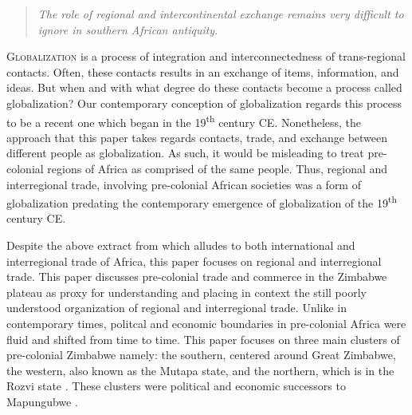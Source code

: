 \begin{filecontents}{\IJSRAidentifier.bib}
	journal = "Journal of African Archaeology",
	year    = "2009",
	volume  = "7",
	number  = "1",
	pages   = "3-39",
}
@article{wood2000,
	author  = "Wood, M.",
	title   = "Making Connections: Relationships between international trade and glass beads from the Shashe-Limpopo area",
	journal = "South African Archaeological Society Goodwin Series",
	year    = "2000",
	volume  = "8",
	pages   = "78-90"
}
@book{sinclair1987,
	author    = "Sinclair, P.J.J.",
	title     = "Space, Time and Social Formation: A Territorial Approach to the Archaeology and Anthropology of Zimbabwe and Mozambique, c. 0–1700 A.D.",
	publisher = "Societas Archaeologica Upsaliensis",
	year      = "1987",
	address   = "Uppsala"
}

\end{filecontents}
\IJSRAopening%

\blockcquote[][6]{pikirayi2017}{\emph{The role of regional and intercontinental exchange remains very difficult to ignore in southern African antiquity}.}

\lettrine{G}{lobalization} is a process of integration and interconnectedness of trans-regional contacts. Often, these contacts results in an exchange of items, information, and ideas. But when and with what degree do these contacts become a process called globalization? Our contemporary conception of globalization regards this process to be a recent one which began in the 19\textsuperscript{th} century CE. Nonetheless, the approach that this paper takes regards contacts, trade, and exchange between different people as globalization. As such, it would be misleading to treat pre-colonial regions of Africa as comprised of the same people. Thus, regional and interregional trade, involving pre-colonial African societies was a form of globalization predating the contemporary emergence of globalization of the 19\textsuperscript{th} century CE.

Despite the above extract from \parencite{pikirayi2017} which alludes to both international and interregional trade of Africa, this paper focuses on regional and interregional trade. This paper discusses pre-colonial trade and commerce in the Zimbabwe plateau as proxy for understanding and placing in context the still poorly understood  organization of regional and interregional trade. Unlike in contemporary times, politcal and economic boundaries in pre-colonial Africa were fluid and shifted from time to time. This paper focuses on three main clusters of pre-colonial Zimbabwe namely: the southern, centered around Great Zimbabwe, the western, also known as the Mutapa state, and the northern, which is in the Rozvi state .
These clusters were political and economic successors to Mapungubwe
\parencites{huffman2000}[][]{huffman2009}[][]{huffman2015}[][]{pikirayi1993}[][]{pikirayi2001}[][]{pwiti2005}.

